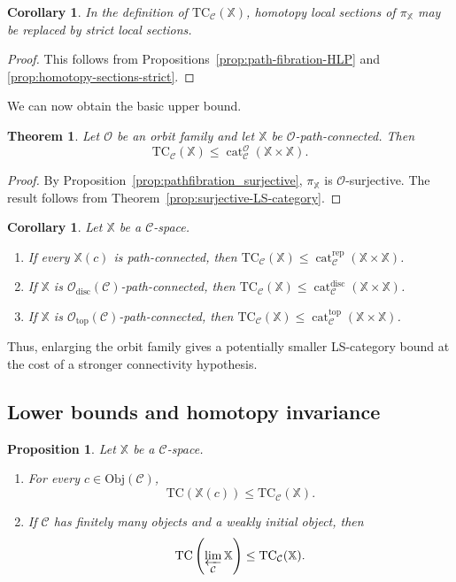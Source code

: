 \documentclass[12pt]{amsart}
\newtheorem{thm}[teo]{Theorem}
\newtheorem{cor}[teo]{Corollary}
\newtheorem{prop}[teo]{Proposition}
\theoremstyle{definition}
\theoremstyle{remark}
\numberwithin{figure}{section}%
\newcommand{\CC}{\mathcal{C}}
\newcommand{\cat}{\mathop{\mathrm{cat}}}
\newcommand{\TC}{\mathrm{TC}}
\newcommand{\X}{\mathbb{X}}
\newcommand{\Obj}{\mathrm{Obj}}
\begin{document}
\begin{cor}\label{cor:TC-strict-sections}
In the definition of $\TC_{\CC}(\X)$, homotopy local sections of
$\pi_{\X}$ may be replaced by strict local sections.
\end{cor}

\begin{proof}
This follows from Propositions~\ref{prop:path-fibration-HLP} and
\ref{prop:homotopy-sections-strict}.
\end{proof}
We can now obtain the basic upper bound.

\begin{thm}\label{thm:TC-category-bound}
Let $\mathcal O$ be an orbit family and let $\X$ be
$\mathcal O$-path-connected. Then
\[
\TC_{\CC}(\X)
\leq
\cat_{\CC}^{\mathcal O}(\X\times\X).
\]
\end{thm}

\begin{proof}
By Proposition~\ref{prop:pathfibration_surjective}, $\pi_{\X}$ is
$\mathcal O$-surjective. The result follows from
Theorem~\ref{prop:surjective-LS-category}.
\end{proof}

\begin{cor}\label{cor:TC-three-families}
Let $\X$ be a $\CC$-space.
\begin{enumerate}
    \item If every $\X(c)$ is path-connected, then
    $\TC_{\CC}(\X)\leq
    \cat_{\CC}^{\mathrm{rep}}(\X\times\X)$.

    \item If $\X$ is
    $\mathcal O_{\mathrm{disc}}(\CC)$-path-connected, then
    $\TC_{\CC}(\X)\leq
    \cat_{\CC}^{\mathrm{disc}}(\X\times\X)$.

    \item If $\X$ is
    $\mathcal O_{\mathrm{top}}(\CC)$-path-connected, then
    $\TC_{\CC}(\X)\leq
    \cat_{\CC}^{\mathrm{top}}(\X\times\X)$.
\end{enumerate}
\end{cor}

Thus, enlarging the orbit family gives a potentially smaller
LS-category bound at the cost of a stronger connectivity hypothesis.

\subsection{Lower bounds and homotopy invariance}

\begin{prop}
\label{prop:TC-objectwise}
\label{prop:TC-limit}
Let $\X$ be a $\CC$-space.
\begin{enumerate}
    \item For every $c\in\Obj(\CC)$,
    \[
    \TC(\X(c))\leq\TC_{\CC}(\X).
    \]

    \item If $\CC$ has finitely many objects and a weakly initial
    object, then
    \[
    \TC\left(\varprojlim_{\CC}\X\right)
    \leq
    \TC_{\CC}(\X).
    \]
\end{enumerate}
\end{prop}
\end{document}

